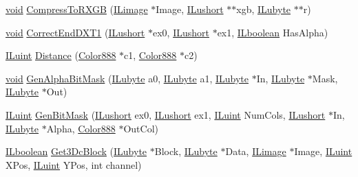 \begin{DoxyCompactItemize}
\item 
\hyperlink{il_8h_a5530e04d947bcddd83639ea7940faf10}{void} \hyperlink{il__dds-save_8c_a2d62b83df87c6f0620373ee456efe066}{Compress\-To\-R\-X\-G\-B} (\hyperlink{struct_i_limage}{I\-Limage} $\ast$Image, \hyperlink{il_8h_af6287b43748354a7c4864da43ae56962}{I\-Lushort} $\ast$$\ast$xgb, \hyperlink{il_8h_a8d2f04500100a86d1b00e98ab1b15a33}{I\-Lubyte} $\ast$$\ast$r)
\item 
\hyperlink{il_8h_a5530e04d947bcddd83639ea7940faf10}{void} \hyperlink{il__dds-save_8c_a0836e521cd86c7fd3013fe6257747b0c}{Correct\-End\-D\-X\-T1} (\hyperlink{il_8h_af6287b43748354a7c4864da43ae56962}{I\-Lushort} $\ast$ex0, \hyperlink{il_8h_af6287b43748354a7c4864da43ae56962}{I\-Lushort} $\ast$ex1, \hyperlink{il_8h_a8be80d75c2c636b9f2250fe10c2e7874}{I\-Lboolean} Has\-Alpha)
\item 
\hyperlink{il_8h_ac6508d0e9c19e32f32e00d54b5b8cf30}{I\-Luint} \hyperlink{il__dds-save_8c_ad259b155b1971907e10a190b35f3cad1}{Distance} (\hyperlink{struct_color888}{Color888} $\ast$c1, \hyperlink{struct_color888}{Color888} $\ast$c2)
\item 
\hyperlink{il_8h_a5530e04d947bcddd83639ea7940faf10}{void} \hyperlink{il__dds-save_8c_a693e23e8986e569bfa0d670ad67daada}{Gen\-Alpha\-Bit\-Mask} (\hyperlink{il_8h_a8d2f04500100a86d1b00e98ab1b15a33}{I\-Lubyte} a0, \hyperlink{il_8h_a8d2f04500100a86d1b00e98ab1b15a33}{I\-Lubyte} a1, \hyperlink{il_8h_a8d2f04500100a86d1b00e98ab1b15a33}{I\-Lubyte} $\ast$In, \hyperlink{il_8h_a8d2f04500100a86d1b00e98ab1b15a33}{I\-Lubyte} $\ast$Mask, \hyperlink{il_8h_a8d2f04500100a86d1b00e98ab1b15a33}{I\-Lubyte} $\ast$Out)
\item 
\hyperlink{il_8h_ac6508d0e9c19e32f32e00d54b5b8cf30}{I\-Luint} \hyperlink{il__dds-save_8c_a1fa7026417a3053aab39cc8bee9aef0d}{Gen\-Bit\-Mask} (\hyperlink{il_8h_af6287b43748354a7c4864da43ae56962}{I\-Lushort} ex0, \hyperlink{il_8h_af6287b43748354a7c4864da43ae56962}{I\-Lushort} ex1, \hyperlink{il_8h_ac6508d0e9c19e32f32e00d54b5b8cf30}{I\-Luint} Num\-Cols, \hyperlink{il_8h_af6287b43748354a7c4864da43ae56962}{I\-Lushort} $\ast$In, \hyperlink{il_8h_a8d2f04500100a86d1b00e98ab1b15a33}{I\-Lubyte} $\ast$Alpha, \hyperlink{struct_color888}{Color888} $\ast$Out\-Col)
\item 
\hyperlink{il_8h_a8be80d75c2c636b9f2250fe10c2e7874}{I\-Lboolean} \hyperlink{il__dds-save_8c_ad6883a9c57a7db02f169376f590f44c0}{Get3\-Dc\-Block} (\hyperlink{il_8h_a8d2f04500100a86d1b00e98ab1b15a33}{I\-Lubyte} $\ast$Block, \hyperlink{il_8h_a8d2f04500100a86d1b00e98ab1b15a33}{I\-Lubyte} $\ast$Data, \hyperlink{struct_i_limage}{I\-Limage} $\ast$Image, \hyperlink{il_8h_ac6508d0e9c19e32f32e00d54b5b8cf30}{I\-Luint} X\-Pos, \hyperlink{il_8h_ac6508d0e9c19e32f32e00d54b5b8cf30}{I\-Luint} Y\-Pos, int channel)

\end{DoxyCompactItemize}
